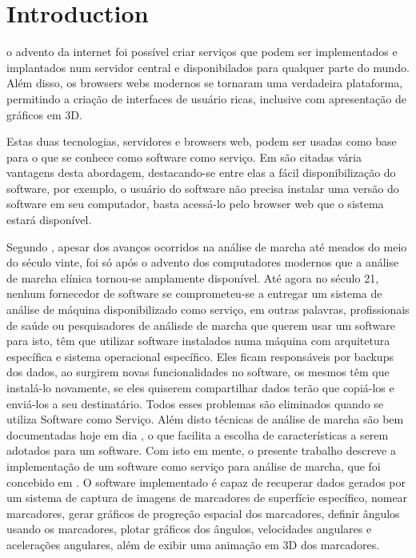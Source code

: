 \documentclass[journal]{IEEEtran}
\begin{document}
\section{Introduction}
% 
% 
% 
% 
 o advento da internet foi possível criar serviços 
que podem ser implementados e implantados num servidor central e 
disponibilados para qualquer parte do mundo. 
Além disso, os browsers webs modernos se tornaram uma verdadeira plataforma,
permitindo a criação de interfaces de usuário ricas, inclusive com apresentação 
de gráficos em 3D. 

Estas duas tecnologias, servidores e browsers web, podem ser 
usadas como base para o que se conhece como software como serviço. 
Em \cite{Fox2012} são citadas vária vantagens desta abordagem, 
destacando-se entre elas a fácil disponibilização do software,
por exemplo, o usuário do software não precisa instalar uma 
versão do software em seu computador, basta acessá-lo pelo
browser web que o sistema estará disponível.

Segundo \cite{Baker2007}, apesar dos avanços ocorridos na análise de marcha 
até meados do meio do século
vinte, foi só após o advento dos computadores modernos 
que a análise de marcha clínica
tornou-se amplamente disponível. 
Até agora no século 21, nenhum fornecedor de software se comprometeu-se
a
entregar um sistema de análise de máquina disponibilizado como serviço,
em outras palavras, profissionais de saúde ou pesquisadores de análisde de marcha
que querem usar um software para isto, têm que utilizar software instalados
numa máquina com arquitetura específica e sistema operacional específico. 
Eles ficam responsáveis por backups dos dados,
ao surgirem novas funcionalidades no software, os mesmos têm que instalá-lo
novamente, se eles quiserem compartilhar dados terão que copiá-los e enviá-los
a seu destinatário. 
Todos esses problemas são eliminados quando se utiliza Software como Serviço.
Além disto técnicas de análise de marcha são bem documentadas hoje em dia
\cite{Perry2010}, o que facilita a escolha de características a serem adotados
para um software.
Com isto em mente, o presente trabalho descreve a implementação
de um software como serviço para análise de marcha, que foi
concebido em \cite{Lima2015}. 
O software implementado é capaz de recuperar dados gerados por um sistema de
captura de imagens de marcadores de superfície específico, 
nomear marcadores,
gerar gráficos de progreção espacial dos marcadores, 
definir ângulos usando os marcadores, plotar gráficos dos ângulos, 
velocidades angulares e acelerações angulares, além de exibir uma animação
em 3D dos marcadores.
\end{document}
